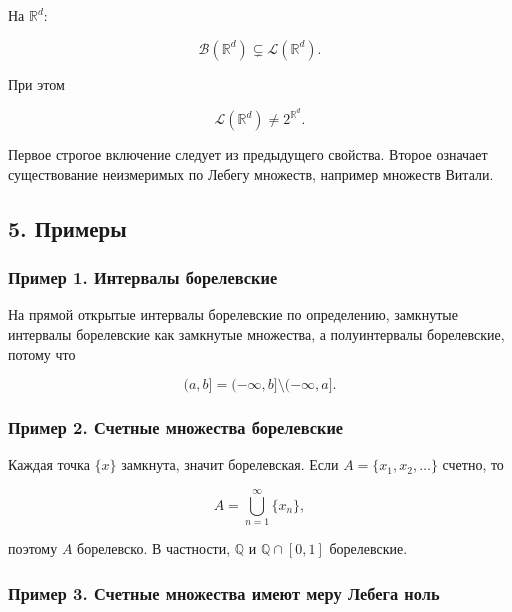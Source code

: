 \documentclass[
  11pt,
  a4paper,
]{article}
\begin{document}
На \(\mathbb R^d\):

\[
\mathcal B(\mathbb R^d)\subsetneq\mathcal L(\mathbb R^d).
\]

При этом

\[
\mathcal L(\mathbb R^d)\ne 2^{\mathbb R^d}.
\]

Первое строгое включение следует из предыдущего свойства. Второе
означает существование неизмеримых по Лебегу множеств, например множеств
Витали.

\subsection{5. Примеры}\label{ux43fux440ux438ux43cux435ux440ux44b}

\subsubsection{Пример 1. Интервалы
борелевские}\label{ux43fux440ux438ux43cux435ux440-1.-ux438ux43dux442ux435ux440ux432ux430ux43bux44b-ux431ux43eux440ux435ux43bux435ux432ux441ux43aux438ux435}

На прямой открытые интервалы борелевские по определению, замкнутые
интервалы борелевские как замкнутые множества, а полуинтервалы
борелевские, потому что

\[
(a,b]=(-\infty,b]\setminus(-\infty,a].
\]

\subsubsection{Пример 2. Счетные множества
борелевские}\label{ux43fux440ux438ux43cux435ux440-2.-ux441ux447ux435ux442ux43dux44bux435-ux43cux43dux43eux436ux435ux441ux442ux432ux430-ux431ux43eux440ux435ux43bux435ux432ux441ux43aux438ux435}

Каждая точка \(\{x\}\) замкнута, значит борелевская. Если
\(A=\{x_1,x_2,\ldots\}\) счетно, то

\[
A=\bigcup_{n=1}^{\infty}\{x_n\},
\]

поэтому \(A\) борелевско. В частности, \(\mathbb Q\) и
\(\mathbb Q\cap[0,1]\) борелевские.

\subsubsection{Пример 3. Счетные множества имеют меру Лебега
ноль}\label{ux43fux440ux438ux43cux435ux440-3.-ux441ux447ux435ux442ux43dux44bux435-ux43cux43dux43eux436ux435ux441ux442ux432ux430-ux438ux43cux435ux44eux442-ux43cux435ux440ux443-ux43bux435ux431ux435ux433ux430-ux43dux43eux43bux44c}
\end{document}
